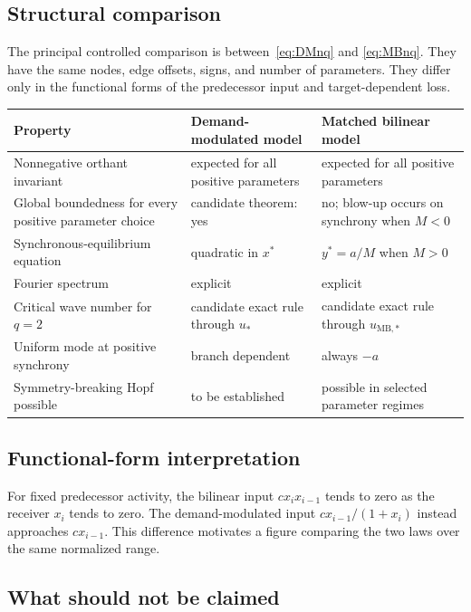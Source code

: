 \documentclass[11pt, reqno]{amsart}
\theoremstyle{definition}
\theoremstyle{remark}
\newcommand{\MB}{\mathrm{MB}}
\begin{document}
\subsection{Structural comparison}

The principal controlled comparison is between~\eqref{eq:DMnq} and
\eqref{eq:MBnq}.  They have the same nodes, edge offsets, signs, and number of
parameters.  They differ only in the functional forms of the predecessor input
and target-dependent loss.

\begin{center}
\begin{tabular}{p{4.5cm}p{4.5cm}p{4.5cm}}
\toprule
Property & Demand-modulated model & Matched bilinear model \\
\midrule
Nonnegative orthant invariant & expected for all positive parameters & expected for all positive parameters \\
Global boundedness for every positive parameter choice & candidate theorem: yes & no; blow-up occurs on synchrony when $M<0$ \\
Synchronous-equilibrium equation & quadratic in $x^*$ & $y^*=a/M$ when $M>0$ \\
Fourier spectrum & explicit & explicit \\
Critical wave number for $q=2$ & candidate exact rule through $u_*$ & candidate exact rule through $u_{\MB,*}$ \\
Uniform mode at positive synchrony & branch dependent & always $-a$ \\
Symmetry-breaking Hopf possible & to be established & possible in selected parameter regimes \\
\bottomrule
\end{tabular}
\end{center}

\subsection{Functional-form interpretation}

For fixed predecessor activity, the bilinear input $c x_i x_{i-1}$ tends to zero
as the receiver $x_i$ tends to zero.  The demand-modulated input
$c x_{i-1}/(1+x_i)$ instead approaches $c x_{i-1}$.  This difference motivates
a figure comparing the two laws over the same normalized range.


\subsection{What should not be claimed}
\end{document}
